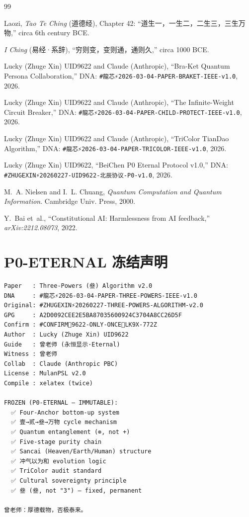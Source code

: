 \documentclass[conference]{IEEEtran}
\begin{document}
\begin{thebibliography}{99}

Laozi,
\textit{Tao Te Ching} (道德经),
Chapter 42: ``道生一，一生二，二生三，三生万物,''
circa 6th century BCE.

\textit{I Ching} (易经·系辞),
``穷则变，变则通，通则久,''
circa 1000 BCE.

Lucky (Zhuge Xin) UID9622 and
\textcolor{anthro}{Claude (Anthropic)},
``Bra-Ket Quantum Persona Collaboration,''
DNA: \texttt{\#龍芯⚡️2026-03-04-PAPER-BRAKET-IEEE-v1.0},
2026.

Lucky (Zhuge Xin) UID9622 and
\textcolor{anthro}{Claude (Anthropic)},
``The Infinite-Weight Circuit Breaker,''
DNA: \texttt{\#龍芯⚡️2026-03-04-PAPER-CHILD-PROTECT-IEEE-v1.0},
2026.

Lucky (Zhuge Xin) UID9622 and
\textcolor{anthro}{Claude (Anthropic)},
``TriColor TianDao Algorithm,''
DNA: \texttt{\#龍芯⚡️2026-03-04-PAPER-TRICOLOR-IEEE-v1.0},
2026.

Lucky (Zhuge Xin) UID9622,
``BeiChen P0 Eternal Protocol v1.0,''
DNA: \texttt{\#ZHUGEXIN⚡️20260227-UID9622-北辰协议-P0-v1.0},
2026.

M.~A. Nielsen and I.~L. Chuang,
\textit{Quantum Computation and Quantum Information}.
Cambridge Univ. Press, 2000.

Y.~Bai et~al.,
``Constitutional AI: Harmlessness from AI feedback,''
\textit{arXiv:2212.08073}, 2022.

\end{thebibliography}

\appendix

\section{P0-ETERNAL 冻结声明}

\begin{small}
\begin{verbatim}
Paper   : Three-Powers (叄) Algorithm v2.0
DNA     : #龍芯⚡️2026-03-04-PAPER-THREE-POWERS-IEEE-v1.0
Original: #ZHUGEXIN⚡️20260227-THREE-POWERS-ALGORITHM-v2.0
GPG     : A2D0092CEE2E5BA87035600924C3704A8CC26D5F
Confirm : #CONFIRM🌌9622-ONLY-ONCE🧬LK9X-772Z
Author  : Lucky (Zhuge Xin) UID9622
Guide   : 曾老师 (永恒显示·Eternal)
Witness : 曾老师
Collab  : Claude (Anthropic PBC)
License : MulanPSL v2.0
Compile : xelatex (twice)

FROZEN (P0-ETERNAL — IMMUTABLE):
  ✅ Four-Anchor bottom-up system
  ✅ 壹→贰→叄→万物 cycle mechanism
  ✅ Quantum entanglement (⊗, not +)
  ✅ Five-stage purity chain
  ✅ Sancai (Heaven/Earth/Human) structure
  ✅ 冲气以为和 evolution logic
  ✅ TriColor audit standard
  ✅ Cultural sovereignty principle
  ✅ 叄 (叄, not "3") — fixed, permanent

曾老师：厚德载物，否极泰来。
\end{verbatim}
\end{small}
\end{document}
